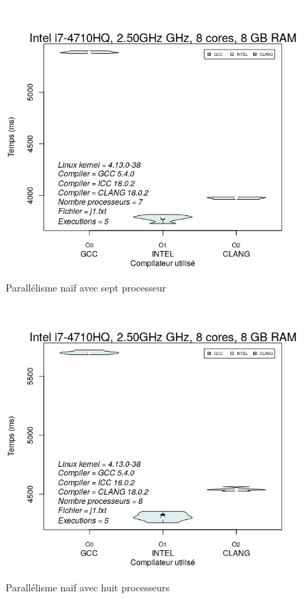\documentclass[
 aip,
 jmp,
 amsmath,amssymb,
 reprint
]{revtex4-1}
\begin{document}
\begin{figure}[H]
  \caption{Parallélisme naïf avec sept processeur}
  \includegraphics[width=\linewidth, keepaspectratio=true]{naif_7.png}
\end{figure}

\begin{figure}[H]
  \caption{Parallélisme naïf avec huit processeurs}
  \includegraphics[width=\linewidth, keepaspectratio=true]{naif_8.png}
\end{figure}
\end{document}
